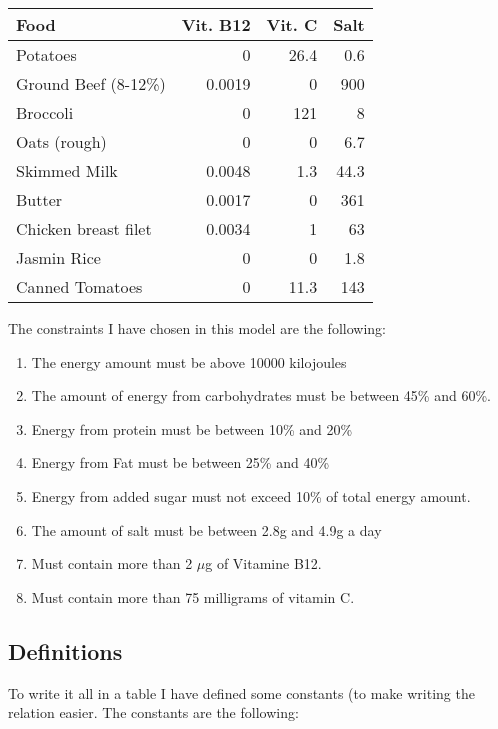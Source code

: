 \documentclass[margin=0.3in]{article}
\begin{document}
\begin{center}
\begin{tabular}{lrrr}
\hline
\textbf{Food} & \textbf{Vit. B12} & \textbf{Vit. C} & \textbf{Salt}\\
\hline
Potatoes & 0 & 26.4 & 0.6\\
\hline
Ground Beef (8-12\%) & 0.0019 & 0 & 900\\
\hline
Broccoli & 0 & 121 & 8\\
\hline
Oats (rough) & 0 & 0 & 6.7\\
\hline
Skimmed Milk & 0.0048 & 1.3 & 44.3\\
\hline
Butter & 0.0017 & 0 & 361\\
\hline
Chicken breast filet & 0.0034 & 1 & 63\\
\hline
Jasmin Rice & 0 & 0 & 1.8\\
\hline
Canned Tomatoes & 0 & 11.3 & 143\\
\hline
\end{tabular}
\end{center}


The constraints I have chosen in this model are the following:
\begin{enumerate}
\item The energy amount must be above 10000 kilojoules
\item The amount of energy from carbohydrates must be between 45\% and 60\%.
\item Energy from protein must be between 10\% and 20\%
\item Energy from Fat must be between 25\% and 40\%
\item Energy from added sugar must not exceed 10\% of total energy amount.
\item The amount of salt must be between 2.8g and 4.9g a day
\item Must contain more than 2 $\mu$g of Vitamine B12.
\item Must contain more than 75 milligrams of vitamin C.
\end{enumerate}

\subsection{Definitions}
\label{sec-1-2}
To write it all in a table I have defined some constants (to make writing the relation easier. The constants are the following:
\end{document}
